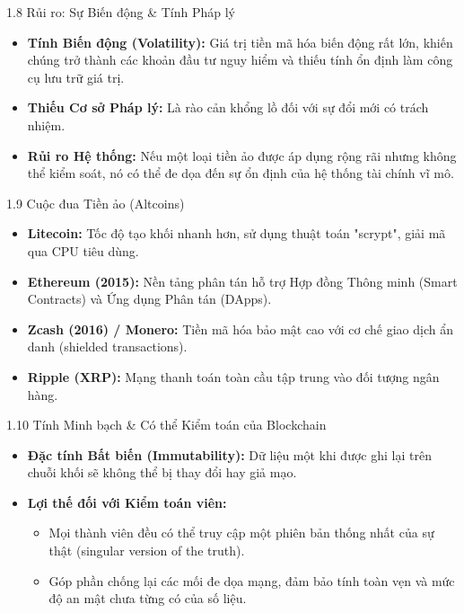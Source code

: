 \documentclass[aspectratio=169]{beamer}
\begin{document}
\begin{frame}{1.8 Rủi ro: Sự Biến động \& Tính Pháp lý}
    \begin{itemize}
        \item \textbf{Tính Biến động (Volatility):} Giá trị tiền mã hóa biến động rất lớn, khiến chúng trở thành các khoản đầu tư nguy hiểm và thiếu tính ổn định làm công cụ lưu trữ giá trị.
        \item \textbf{Thiếu Cơ sở Pháp lý:} Là rào cản khổng lồ đối với sự đổi mới có trách nhiệm.
        \item \textbf{Rủi ro Hệ thống:} Nếu một loại tiền ảo được áp dụng rộng rãi nhưng không thể kiểm soát, nó có thể đe dọa đến sự ổn định của hệ thống tài chính vĩ mô.
    \end{itemize}
\end{frame}

\begin{frame}{1.9 Cuộc đua Tiền ảo (Altcoins)}
    \begin{itemize}
        \item \textbf{Litecoin:} Tốc độ tạo khối nhanh hơn, sử dụng thuật toán "scrypt", giải mã qua CPU tiêu dùng.
        \item \textbf{Ethereum (2015):} Nền tảng phân tán hỗ trợ Hợp đồng Thông minh (Smart Contracts) và Ứng dụng Phân tán (DApps).
        \item \textbf{Zcash (2016) / Monero:} Tiền mã hóa bảo mật cao với cơ chế giao dịch ẩn danh (shielded transactions).
        \item \textbf{Ripple (XRP):} Mạng thanh toán toàn cầu tập trung vào đối tượng ngân hàng.
    \end{itemize}
\end{frame}

\begin{frame}{1.10 Tính Minh bạch \& Có thể Kiểm toán của Blockchain}
    \begin{itemize}
        \item \textbf{Đặc tính Bất biến (Immutability):} Dữ liệu một khi được ghi lại trên chuỗi khối sẽ không thể bị thay đổi hay giả mạo.
        \item \textbf{Lợi thế đối với Kiểm toán viên:} 
        \begin{itemize}
            \item Mọi thành viên đều có thể truy cập một phiên bản thống nhất của sự thật (singular version of the truth).
            \item Góp phần chống lại các mối đe dọa mạng, đảm bảo tính toàn vẹn và mức độ an mật chưa từng có của số liệu.
        \end{itemize}
    \end{itemize}
\end{frame}
\end{document}

